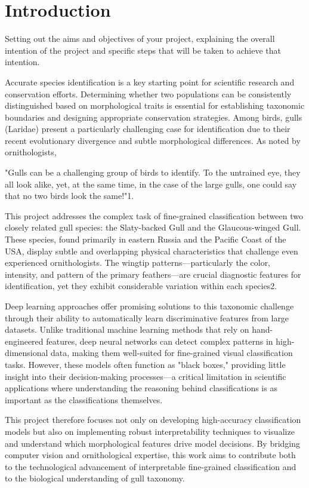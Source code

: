 \usepackage{hyperref}\chapter{Introduction}

Setting out the aims and objectives of your project, explaining the overall intention of the project and specific steps that will be taken to achieve that intention.



Accurate species identification is a key starting point for scientific research and conservation efforts. Determining whether two populations can be consistently distinguished based on morphological traits is essential for establishing taxonomic boundaries and designing appropriate conservation strategies. Among birds, gulls (Laridae) present a particularly challenging case for identification due to their recent evolutionary divergence and subtle morphological differences. As noted by ornithologists,

"Gulls can be a challenging group of birds to identify. To the untrained eye, they all look alike, yet, at the same time, in the case of the large gulls, one could say that no two birds look the same!"1.

This project addresses the complex task of fine-grained classification between two closely related gull species: the Slaty-backed Gull and the Glaucous-winged Gull. These species, found primarily in eastern Russia and the Pacific Coast of the USA, display subtle and overlapping physical characteristics that challenge even experienced ornithologists. The wingtip patterns—particularly the color, intensity, and pattern of the primary feathers—are crucial diagnostic features for identification, yet they exhibit considerable variation within each species2.

Deep learning approaches offer promising solutions to this taxonomic challenge through their ability to automatically learn discriminative features from large datasets. Unlike traditional machine learning methods that rely on hand-engineered features, deep neural networks can detect complex patterns in high-dimensional data, making them well-suited for fine-grained visual classification tasks. However, these models often function as "black boxes," providing little insight into their decision-making processes—a critical limitation in scientific applications where understanding the reasoning behind classifications is as important as the classifications themselves.

This project therefore focuses not only on developing high-accuracy classification models but also on implementing robust interpretability techniques to visualize and understand which morphological features drive model decisions. By bridging computer vision and ornithological expertise, this work aims to contribute both to the technological advancement of interpretable fine-grained classification and to the biological understanding of gull taxonomy.



